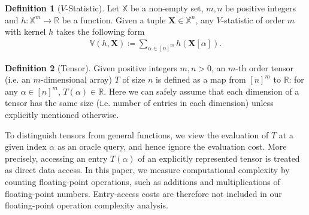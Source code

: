 \documentclass[sn-mathphys, natbib=false]{sn-jnl}
\theoremstyle{plain}
\theoremstyle{definition}
\newtheorem{definition}{Definition}
\newtheorem{remark}{Remark}
\newcommand{\ustat}{\mathbb{U}}
\newcommand{\vstat}{\mathbb{V}}
\newcommand{\ustatp}[2]{\ustat(#1,#2)}
\newcommand{\vstatp}[2]{\vstat(#1,#2)}
\newcommand{\perm}[1]{\mathsf{Perm}(#1)}
\newif\ifshowchanges
\newcommand{\rev}[1]{%
  \ifshowchanges
    {\color{red} #1}%
  \else
    #1%
  \fi
}
\newcommand{\bbR}{{\mathbb{R}}}
\newcommand{\reals}{{\mathbb{R}}}
\def\bbX{\mathbb{X}}
\begin{document}
\begin{bibunit}[agsm]

\begin{definition}[$V$-Statistic]\label{def:v_stat}
Let $\bbX$ be a non-empty set, $m, n$ be positive integers and $h: \bbX^{m} \rightarrow \bbR$ be a function. Given a tuple $\bm{X} \in \bbX^n$, any $V$-statistic of order $m$ with kernel $h$ takes the following form 
    \begin{align*}
        \vstatp{h}{\bm{X}} \coloneqq \sum_{\alpha \in [n]^m} h(\bm{X}[\alpha]). 
    \end{align*} 
\end{definition}

\begin{definition}[Tensor]
\label{def:tensors}
Given positive integers $m, n > 0$, an $m$-th order tensor (i.e. an $m$-dimensional array) $T$ of size $n$ is defined as a map from $[n]^m$ to $\reals$: for any $\alpha \in [n]^{m}$, $T (\alpha) \in \bbR$. Here we can safely assume that each dimension of a tensor has the same size (i.e. number of entries in each dimension) unless explicitly mentioned otherwise.
\end{definition}

\rev{To distinguish tensors from general functions, we view the evaluation of $T$ at a given index $\alpha$ as an oracle query, and hence ignore the evaluation cost. More precisely, accessing an entry $T(\alpha)$ of an explicitly represented tensor is treated as direct data access. In this paper, we measure computational complexity by counting floating-point operations, such as additions and multiplications of floating-point numbers. Entry-access costs are therefore not included in our floating-point operation complexity analysis.}


\end{bibunit}
\end{document}

